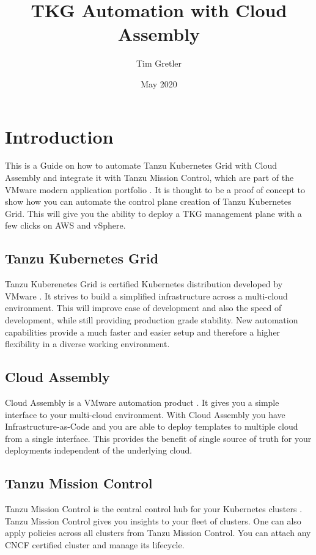 \documentclass{article}
\title{TKG Automation with Cloud Assembly}
\author{Tim Gretler}
\date{May 2020}
\begin{document}
\maketitle


\newpage
\tableofcontents
\newpage


\section{Introduction}
This is a Guide on how to automate Tanzu Kubernetes Grid with Cloud Assembly and integrate it with Tanzu Mission Control, which are part of the VMware modern application portfolio \citep{tanzu}. It is thought to be a proof of concept to show how you can automate the control plane creation of Tanzu Kubernetes Grid. This will give you the ability to deploy a TKG management plane with a few clicks on AWS and vSphere. 

\subsection{Tanzu Kubernetes Grid}
Tanzu Kuberenetes Grid is certified Kubernetes distribution developed by VMware \citep{tkg}. It strives to build a simplified infrastructure across a multi-cloud environment. This will improve ease of development and also the speed of development, while still providing production grade stability. New automation capabilities provide a much faster and easier setup and therefore a higher flexibility in a diverse working environment. 

\subsection{Cloud Assembly}
Cloud Assembly is a VMware automation product \citep{cloudassembly}. It gives you a simple interface to your multi-cloud environment. With Cloud Assembly you have Infrastructure-as-Code and you are able to deploy templates to multiple cloud from a single interface. This provides the benefit of single source of truth for your deployments independent of the underlying cloud. 


\subsection{Tanzu Mission Control}
Tanzu Mission Control is the central control hub for your Kubernetes clusters \citep{tmc}. Tanzu Mission Control gives you insights to your fleet of clusters. One can also apply policies across all clusters from Tanzu Mission Control. You can attach any CNCF certified cluster and manage its lifecycle.
\end{document}
